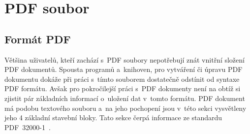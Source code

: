 







\chapter{PDF soubor}

\dummyText



\section{Formát PDF} \label{format_PDF}
Většina uživatelů, kteří zachází s~PDF soubory nepotřebují znát vnitřní složení
PDF dokumentů. Spousta programů a~knihoven, pro vytváření či úpravu PDF dokumentu
dokáže při práci s~tímto souborem dostatečně odstínit od syntaxe PDF formátu.
Avšak pro pokročilejší práci s~PDF dokumenty není na obtíž si zjistit pár
základních informací o~uložení dat v~tomto formátu.
PDF dokument má podobu textového souboru a~na jeho pochopení jsou v~této sekci
vysvětleny jeho 4 základní stavební bloky. Tato sekce čerpá informace ze
standardu PDF~32000-1~\cite{PDF32000-1:2008}.


